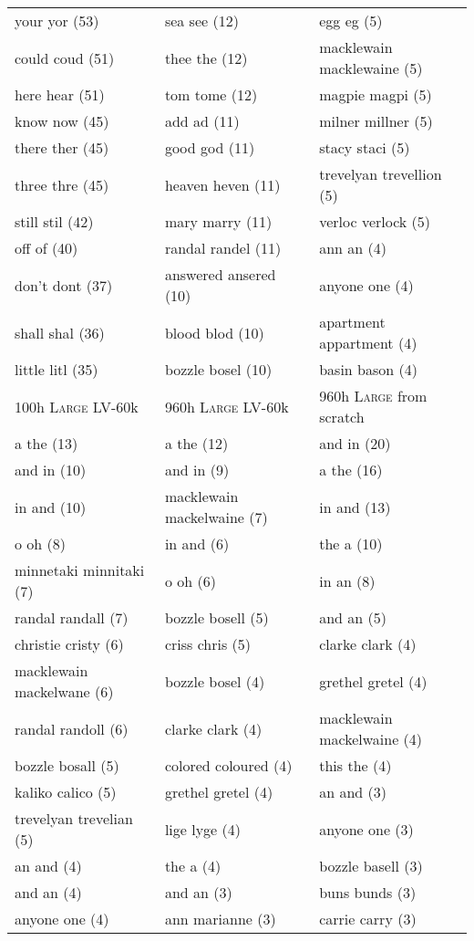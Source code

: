 \documentclass{article}
\newcommand{\wvppbig}{\textsc{Large}}
\newcommand{\voxsz}{LV-60k}
\begin{document}
\begin{table}
\begin{tabular}{l|l|l}
your  yor (53) &sea  see (12) &egg  eg (5) \\
could  coud (51) &thee  the (12) &macklewain  macklewaine (5) \\
here  hear (51) &tom  tome (12) &magpie  magpi (5) \\
know  now (45) &add  ad (11) &milner  millner (5) \\
there  ther (45) &good  god (11) &stacy  staci (5) \\
three  thre (45) &heaven  heven (11) &trevelyan  trevellion (5) \\
still  stil (42) &mary  marry (11) &verloc  verlock (5) \\
off  of (40) &randal  randel (11) &ann  an (4) \\
don't  dont (37) &answered  ansered (10) &anyone  one (4) \\
shall  shal (36) &blood  blod (10) &apartment  appartment (4) \\
little  litl (35) &bozzle  bosel (10) &basin  bason (4) \\
\bottomrule
\midrule
100h \wvppbig{} \voxsz{} & 960h \wvppbig{} \voxsz{} & 960h \wvppbig{} from scratch  \\
\midrule
 a  the (13) & a  the (12) & and  in (20) \\
 and  in (10) & and  in (9) & a  the (16) \\
 in  and (10) & macklewain  mackelwaine (7) & in  and (13) \\
 o  oh (8) & in  and (6) & the  a (10) \\
 minnetaki  minnitaki (7) & o  oh (6) & in  an (8) \\
 randal  randall (7) & bozzle  bosell (5) & and  an (5) \\
 christie  cristy (6) & criss  chris (5) & clarke  clark (4) \\
 macklewain  mackelwane (6) & bozzle  bosel (4) & grethel  gretel (4) \\
 randal  randoll (6) & clarke  clark (4) & macklewain  mackelwaine (4) \\
 bozzle  bosall (5) & colored  coloured (4) & this  the (4) \\
 kaliko  calico (5) & grethel  gretel (4) & an  and (3) \\
 trevelyan  trevelian (5) & lige  lyge (4) & anyone  one (3) \\
 an  and (4) & the  a (4) & bozzle  basell (3) \\
 and  an (4) & and  an (3) & buns  bunds (3) \\
 anyone  one (4) & ann  marianne (3) & carrie  carry (3) \\

\end{tabular}
\end{table}
\end{document}
